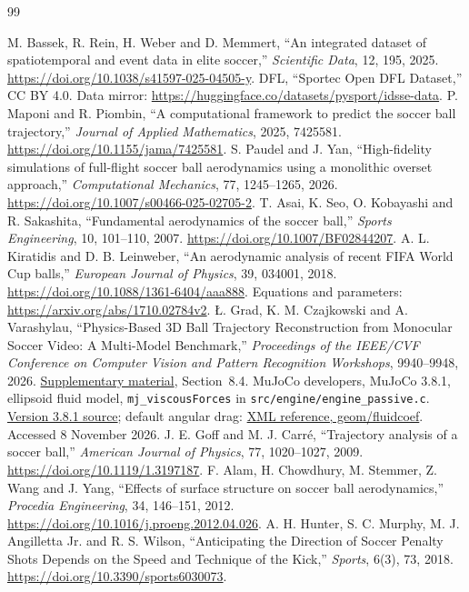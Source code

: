 \documentclass[12pt,letterpaper]{article}
\begin{document}
\begin{thebibliography}{99}
\raggedright
{} M. Bassek, R. Rein, H. Weber and D. Memmert, ``An integrated dataset of spatiotemporal and event data in elite soccer,'' \emph{Scientific Data}, 12, 195, 2025. \url{https://doi.org/10.1038/s41597-025-04505-y}.
 DFL, ``Sportec Open DFL Dataset,'' CC BY 4.0. Data mirror: \url{https://huggingface.co/datasets/pysport/idsse-data}.
 P. Maponi and R. Piombin, ``A computational framework to predict the soccer ball trajectory,'' \emph{Journal of Applied Mathematics}, 2025, 7425581. \url{https://doi.org/10.1155/jama/7425581}.
 S. Paudel and J. Yan, ``High-fidelity simulations of full-flight soccer ball aerodynamics using a monolithic overset approach,'' \emph{Computational Mechanics}, 77, 1245--1265, 2026. \url{https://doi.org/10.1007/s00466-025-02705-2}.
 T. Asai, K. Seo, O. Kobayashi and R. Sakashita, ``Fundamental aerodynamics of the soccer ball,'' \emph{Sports Engineering}, 10, 101--110, 2007. \url{https://doi.org/10.1007/BF02844207}.
 A. L. Kiratidis and D. B. Leinweber, ``An aerodynamic analysis of recent FIFA World Cup balls,'' \emph{European Journal of Physics}, 39, 034001, 2018. \url{https://doi.org/10.1088/1361-6404/aaa888}. Equations and parameters: \url{https://arxiv.org/abs/1710.02784v2}.
 \L{}. Grad, K. M. Czajkowski and A. Varashylau, ``Physics-Based 3D Ball Trajectory Reconstruction from Monocular Soccer Video: A Multi-Model Benchmark,'' \emph{Proceedings of the IEEE/CVF Conference on Computer Vision and Pattern Recognition Workshops}, 9940--9948, 2026. \href{https://openaccess.thecvf.com/content/CVPR2026W/CVsports/supplemental/Grad_Physics-Based_3D_Ball_CVPRW_2026_supplemental.pdf}{Supplementary material}, Section~8.4.
 MuJoCo developers, MuJoCo 3.8.1, ellipsoid fluid model, \texttt{mj\_viscousForces} in \texttt{src/engine/engine\_passive.c}. \href{https://github.com/google-deepmind/mujoco/blob/3.8.1/src/engine/engine_passive.c}{Version 3.8.1 source}; default angular drag: \href{https://mujoco.readthedocs.io/en/stable/XMLreference.html#body-geom-fluidcoef}{XML reference, geom/fluidcoef}. Accessed 8 November 2026.
 J. E. Goff and M. J. Carr\'e, ``Trajectory analysis of a soccer ball,'' \emph{American Journal of Physics}, 77, 1020--1027, 2009. \url{https://doi.org/10.1119/1.3197187}.
 F. Alam, H. Chowdhury, M. Stemmer, Z. Wang and J. Yang, ``Effects of surface structure on soccer ball aerodynamics,'' \emph{Procedia Engineering}, 34, 146--151, 2012. \url{https://doi.org/10.1016/j.proeng.2012.04.026}.
 A. H. Hunter, S. C. Murphy, M. J. Angilletta Jr. and R. S. Wilson, ``Anticipating the Direction of Soccer Penalty Shots Depends on the Speed and Technique of the Kick,'' \emph{Sports}, 6(3), 73, 2018. \url{https://doi.org/10.3390/sports6030073}.
\end{thebibliography}
\end{document}
